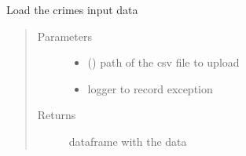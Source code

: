 \documentclass[letterpaper,10pt,english]{sphinxmanual}
\begin{document}
\begin{fulllineitems}
\label{\detokenize{index:dummy_project_utils.load_data}}
\sphinxAtStartPar
{}

\sphinxAtStartPar
Load the crimes input data
\begin{quote}\begin{description}
\item[{Parameters}] \leavevmode\begin{itemize}
\item {} 
\sphinxAtStartPar
{} () \textendash{} path of the csv file to upload

\item {} 
\sphinxAtStartPar
{} \textendash{} logger to record exception

\end{itemize}

\item[{Returns}] \leavevmode
\sphinxAtStartPar
dataframe with the data

\end{description}\end{quote}

\end{fulllineitems}

\end{document}
